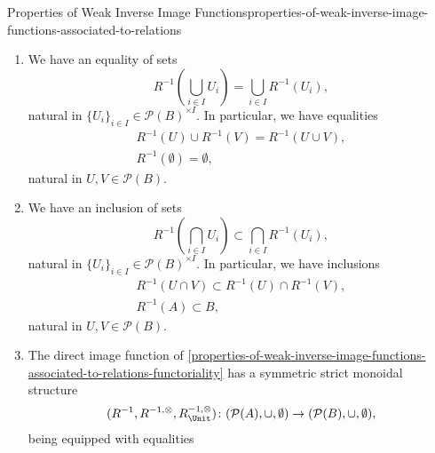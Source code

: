 \begin{proposition}{Properties of Weak Inverse Image Functions}{properties-of-weak-inverse-image-functions-associated-to-relations}
\begin{enumerate}
\begin{itemize}
\begin{itemize}
                    \end{itemize}
            \end{itemize}
        \item\label{properties-of-weak-inverse-image-functions-associated-to-relations-preservation-of-colimits}We have an equality of sets
            \[
                R^{-1}(\bigcup_{i\in I}U_{i})%
                =%
                \bigcup_{i\in I}R^{-1}(U_{i}),%
            \]%
            natural in $\{U_{i}\}_{i\in I}\in\mathcal{P}(B)^{\times I}$. In particular, we have equalities%
            \[
                \begin{gathered}
                    R^{-1}(U)\cup R^{-1}(V) = R^{-1}(U\cup V),\\
                    R^{-1}(\emptyset)       = \emptyset,
                \end{gathered}
            \]%
            natural in $U,V\in\mathcal{P}(B)$.
        \item\label{properties-of-weak-inverse-image-functions-associated-to-relations-oplax-preservation-of-limits}We have an inclusion of sets
            \[
                R^{-1}(\bigcap_{i\in I}U_{i})%
                \subset%
                \bigcap_{i\in I}R^{-1}(U_{i}),%
            \]%
            natural in $\{U_{i}\}_{i\in I}\in\mathcal{P}(B)^{\times I}$. In particular, we have inclusions%
            \[
                \begin{gathered}
                    R^{-1}(U\cap V) \subset R^{-1}(U)\cap R^{-1}(V),\\
                    R^{-1}(A)       \subset B,
                \end{gathered}
            \]%
            natural in $U,V\in\mathcal{P}(B)$.
        \item\label{properties-of-weak-inverse-image-functions-associated-to-relations-symmetric-strict-monoidality-with-respect-to-unions}The direct image function of \cref{properties-of-weak-inverse-image-functions-associated-to-relations-functoriality} has a symmetric strict monoidal structure
            \[
                (R^{-1},R^{-1,\otimes},R^{-1,\otimes}_{\Unit})
                \colon
                (\mathcal{P}(A),\cup,\emptyset)
                \to
                (\mathcal{P}(B),\cup,\emptyset),
            \]%
            being equipped with equalities%
            \[
                \begin{gathered}

\end{gathered}\]
\end{enumerate}
\end{proposition}
